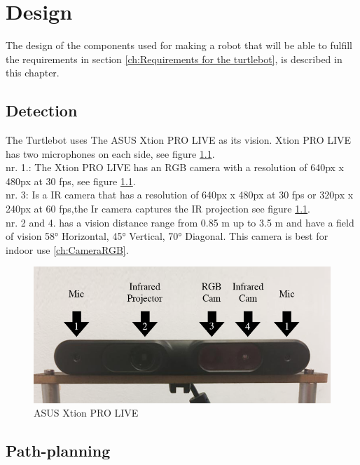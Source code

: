 \chapter{Design}
\label{ch:design}
The design of the components used for making a robot that will be able to fulfill the requirements in section \ref{ch:Requirements for the turtlebot}, is described in this chapter.

%
% 
%
%

\section{Detection} 
The Turtlebot uses The ASUS Xtion PRO LIVE as its vision. Xtion PRO LIVE has two microphones on each side, see figure \ref{fig:asusCamera}.\\ nr. 1.: The Xtion PRO LIVE has an RGB camera with a resolution of 640px x 480px at 30 fps, see figure \ref{fig:asusCamera}.\\ nr. 3: Is a IR camera that has a resolution of 640px x 480px at 30 fps or 320px x 240px at 60 fps,the Ir camera captures the IR projection see figure \ref{fig:asusCamera}.\\
nr. 2 and 4.
 has a vision distance range from 0.85 m up to 3.5 m and have a field of vision 58° Horizontal, 45° Vertical, 70° Diagonal.
This camera is best for indoor use \ref{ch:CameraRGB}.
\begin{figure}[h!]
    \centering
    \includegraphics[width=.7\textwidth]{figures/camera02.png}
    \caption{ASUS Xtion PRO LIVE} 
    \label{fig:asusCamera} 
\end{figure}
\newpage


%
%
%
%

\section{Path-planning}

